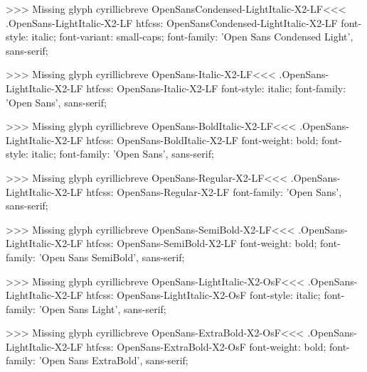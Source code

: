 >>>
Missing glyph	cyrillicbreve
\<OpenSansCondensed-LightItalic-X2-LF\><<<
.OpenSans-LightItalic-X2-LF
htfcss:  OpenSansCondensed-LightItalic-X2-LF  font-style: italic; font-variant: small-caps; font-family: 'Open Sans Condensed Light', sans-serif;

>>>
Missing glyph	cyrillicbreve
\<OpenSans-Italic-X2-LF\><<<
.OpenSans-LightItalic-X2-LF
htfcss:  OpenSans-Italic-X2-LF  font-style: italic; font-family: 'Open Sans', sans-serif;

>>>
Missing glyph	cyrillicbreve
\<OpenSans-BoldItalic-X2-LF\><<<
.OpenSans-LightItalic-X2-LF
htfcss:  OpenSans-BoldItalic-X2-LF  font-weight: bold; font-style: italic; font-family: 'Open Sans', sans-serif;

>>>
Missing glyph	cyrillicbreve
\<OpenSans-Regular-X2-LF\><<<
.OpenSans-LightItalic-X2-LF
htfcss:  OpenSans-Regular-X2-LF  font-family: 'Open Sans', sans-serif;

>>>
Missing glyph	cyrillicbreve
\<OpenSans-SemiBold-X2-LF\><<<
.OpenSans-LightItalic-X2-LF
htfcss:  OpenSans-SemiBold-X2-LF  font-weight: bold; font-family: 'Open Sans SemiBold', sans-serif;

>>>
Missing glyph	cyrillicbreve
\<OpenSans-LightItalic-X2-OsF\><<<
.OpenSans-LightItalic-X2-LF
htfcss:  OpenSans-LightItalic-X2-OsF  font-style: italic; font-family: 'Open Sans Light', sans-serif;

>>>
Missing glyph	cyrillicbreve
\<OpenSans-ExtraBold-X2-OsF\><<<
.OpenSans-LightItalic-X2-LF
htfcss:  OpenSans-ExtraBold-X2-OsF  font-weight: bold; font-family: 'Open Sans ExtraBold', sans-serif;

